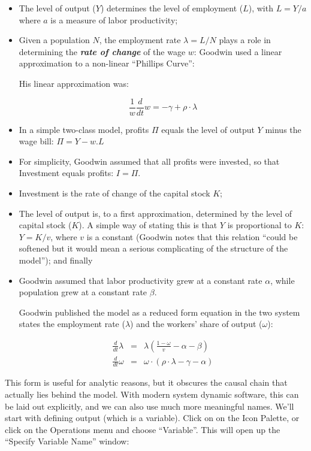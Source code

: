 \begin{itemize}

\item The level of output ($Y$) determines the level of employment ($L$), with $L=Y/a$ where $a$ is a measure of labor productivity;
\item Given a population $N$, the employment rate $\lambda=L/N$ plays
a role in determining the {\bf\em rate of change} of the wage $w$:
Goodwin used a linear approximation to a non-linear ``Phillips
Curve'': 



His linear approximation was:

\begin{displaymath}
\frac1w\frac{d}{dt}w=-\gamma+\rho\cdot\lambda
\end{displaymath}

\item In a simple two-class model, profits $\Pi$ equals the level of
output $Y$ minus the wage bill: $\Pi=Y-w.L$ 
\item For simplicity, Goodwin assumed that all profits were invested, so that Investment equals profits: $I=\Pi$.
\item Investment is the rate of change of the capital stock $K$;
\item The level of output is, to a first approximation, determined by
the level of capital stock ($K$). A simple way of stating this is that
$Y$ is proportional to $K$: $Y=K/v$, where $v$ is a constant (Goodwin
notes that this relation ``could be softened but it would mean a
serious complicating of the structure of the model''); and finally 
\item Goodwin assumed that labor productivity grew at a constant rate $\alpha$, while population grew at a constant rate $\beta$.

Goodwin published the model as a reduced form equation in the two
system states the employment rate ($\lambda$) and the workers' share
of output ($\omega$): 

\begin{eqnarray*}
\frac{d}{dt}\lambda&=&\lambda\left(\frac{1-\omega}{v}-\alpha-\beta\right)\\
\frac{d}{dt}\omega&=&\omega\cdot\left(\rho\cdot\lambda-\gamma-\alpha\right)
\end{eqnarray*}

\end{itemize}

This form is useful for analytic reasons, but it obscures the causal
chain that actually lies behind the model. With modern system dynamic
software, this can be laid out explicitly, and we can also use much
more meaningful names. We'll start with defining output (which is a
variable). Click on  on the Icon Palette, or click on the Operations
menu and choose ``Variable''. This will open up the ``Specify Variable
Name'' window: 

